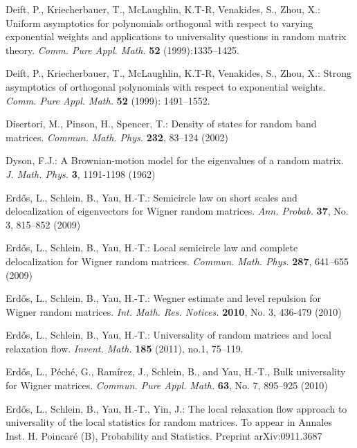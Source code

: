 \documentclass[draft]{article}
\numberwithin{equation}{section}
\numberwithin{theorem}{section}
\numberwithin{definition}{section}
\numberwithin{remark}{section}
\begin{document}
 Deift, P., Kriecherbauer, T., McLaughlin, K.T-R,
 Venakides, S., Zhou, X.: Uniform asymptotics for polynomials 
orthogonal with respect to varying exponential weights and applications
 to universality questions in random matrix theory. 
{\it  Comm. Pure Appl. Math.} {\bf 52} (1999):1335--1425.

 Deift, P., Kriecherbauer, T., McLaughlin, K.T-R,
 Venakides, S., Zhou, X.: Strong asymptotics of orthogonal polynomials 
with respect to exponential weights. 
{\it  Comm. Pure Appl. Math.} {\bf 52} (1999): 1491--1552.






 Disertori, M., Pinson, H., Spencer, T.: Density of
states for random band matrices. {\it Commun. Math. Phys.} {\bf 232},
83--124 (2002)



 Dyson, F.J.: A Brownian-motion model for the eigenvalues
of a random matrix. {\it J. Math. Phys.} {\bf 3}, 1191-1198 (1962)
  




 Erd{\H o}s, L., Schlein, B., Yau, H.-T.:
Semicircle law on short scales and delocalization
of eigenvectors for Wigner random matrices.
{\it Ann. Probab.} {\bf 37}, No. 3, 815--852 (2009)


 Erd{\H o}s, L., Schlein, B., Yau, H.-T.:
Local semicircle law  and complete delocalization
for Wigner random matrices. {\it Commun.
Math. Phys.} {\bf 287}, 641--655 (2009)


 Erd{\H o}s, L., Schlein, B., Yau, H.-T.:
Wegner estimate and level repulsion for Wigner random matrices.
{\it Int. Math. Res. Notices.} {\bf 2010}, No. 3, 436-479 (2010)


 Erd{\H o}s, L., Schlein, B., Yau, H.-T.: Universality
of random matrices and local relaxation flow.
{\it Invent. Math.} {\bf 185} (2011), no.1, 75--119.


Erd\H{o}s, L.,  P\'ech\'e, G.,  Ram\'irez, J.,  Schlein,  B.,
and Yau, H.-T., Bulk universality 
for Wigner matrices. 
{\it Commun. Pure Appl. Math.} {\bf 63}, No. 7,  895--925 (2010)


 Erd{\H o}s, L., Schlein, B., Yau, H.-T., Yin, J.:
The local relaxation flow approach to universality of the local
statistics for random matrices. 
To appear in Annales Inst. H. Poincar\'e (B),  Probability and Statistics.
Preprint arXiv:0911.3687
\end{document}
